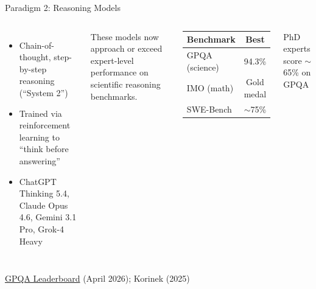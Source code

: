 \documentclass[aspectratio=169, 11pt]{beamer}
\newcommand{\sourceref}[1]{\vspace{0.15cm}\hfill{\tiny\textcolor{medgray}{#1}}}
\begin{document}
\begin{frame}[shrink=1]{Paradigm 2: Reasoning Models}
\begin{columns}[T]
\begin{itemize}
  \item Chain-of-thought, step-by-step reasoning (``System 2'')
  \item Trained via reinforcement learning to ``think before answering''
  \item ChatGPT Thinking 5.4, Claude Opus 4.6, Gemini 3.1 Pro, Grok-4 Heavy
\end{itemize}
\vspace{0.3cm}
\begin{keyinsight}
These models now approach or exceed expert-level performance on scientific reasoning benchmarks.
\end{keyinsight}

\begin{center}
\footnotesize
\begin{tabular}{@{}lc@{}}
\toprule
\textbf{Benchmark} & \textbf{Best} \\
\midrule
GPQA (science) & 94.3\% \\
IMO (math) & Gold medal \\
SWE-Bench & $\sim$75\% \\
\bottomrule
\end{tabular}
\end{center}
\vspace{0.4cm}
\begin{center}
\scriptsize\textcolor{medgray}{PhD experts score $\sim$65\% on GPQA}
\end{center}
\end{columns}
\sourceref{\href{https://llm-stats.com/benchmarks/gpqa}{GPQA Leaderboard} (April 2026); Korinek (2025)}
\end{frame}
\end{document}
